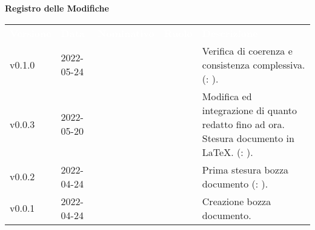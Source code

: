 
{\LARGE{\textbf{Registro delle Modifiche}}} \\
\renewcommand{\arraystretch}{1.5}
\begin{longtable}{ m{}<{\centering}  m{}<{\centering}  m{}<{\centering}  m{}<{\centering}  m{}<{\centering} }
	\rowcolor{darkblue}
	\textcolor{white}{\textbf{Versione}} &\textcolor{white}{\textbf{Data}}& \textcolor{white}{\textbf{Nominativo}} & \textcolor{white}{\textbf{Ruolo}}&\textcolor{white}{\textbf{Descrizione}}\\ 
	
	v0.1.0 & 2022-05-24 & \GC & \PR & Verifica di coerenza e consistenza complessiva. (\VE: \textit{\PV}). \\

	v0.0.3 & 2022-05-20 & \GC & \PR & Modifica ed integrazione di quanto redatto fino ad ora. Stesura documento in \LaTeX{}. (\VE: \textit{\PV}). \\

	v0.0.2 & 2022-04-24 & \GC & \PR & Prima stesura bozza documento (\VE: \textit{\PV}). \\

	v0.0.1 & 2022-04-24 & \GC & \PR & Creazione bozza documento. \\

\end{longtable}

\pagebreak